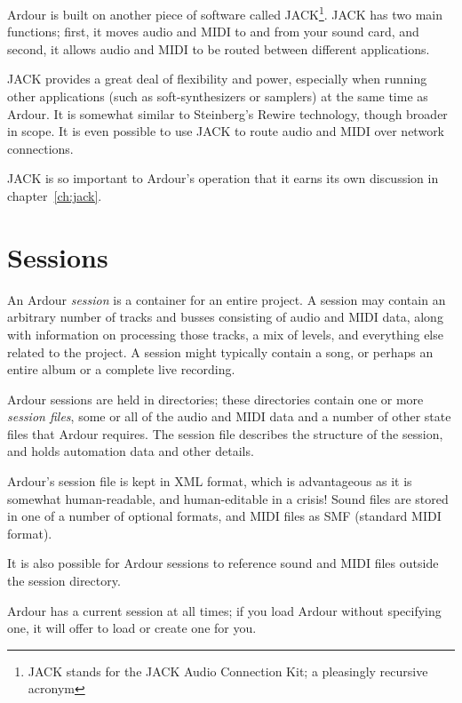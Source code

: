 \documentclass{book}
\begin{document}
Ardour is built on another piece of software called JACK\footnote{JACK
  stands for the JACK Audio Connection Kit; a pleasingly recursive acronym}.
JACK has two main functions; first, it moves audio and MIDI to
and from your sound card, and second, it allows audio and MIDI to be
routed between different applications.

JACK provides a great deal of flexibility and power, especially when
running other applications (such as soft-synthesizers or samplers) at
the same time as Ardour.  It is somewhat similar to Steinberg's Rewire
technology, though broader in scope.  It is even possible to use JACK
to route audio and MIDI over network connections.

JACK is so important to Ardour's operation that it earns its own
discussion in chapter~\ref{ch:jack}.


\section{Sessions}

An Ardour \emph{session} is a container for an entire project.  A
session may contain an arbitrary number of tracks and busses
consisting of audio and MIDI data, along with information on processing
those tracks, a mix of levels, and everything else related to the
project.  A session might typically contain a song, or perhaps an entire
album or a complete live recording.

Ardour sessions are held in directories; these directories contain one
or more \emph{session files}, some or all of the audio and MIDI data
and a number of other state files that Ardour requires.  The session
file describes the structure of the session, and holds automation data
and other details.

\begin{danger}
Ardour's session file is kept in XML format, which is advantageous as
it is somewhat human-readable, and human-editable in a crisis!  Sound
files are stored in one of a number of optional formats, and MIDI
files as SMF (standard MIDI format).

It is also possible for Ardour sessions to reference sound and MIDI
files outside the session directory.
\end{danger}

Ardour has a current session at all times; if you load Ardour without
specifying one, it will offer to load or create one for you.
\end{document}

